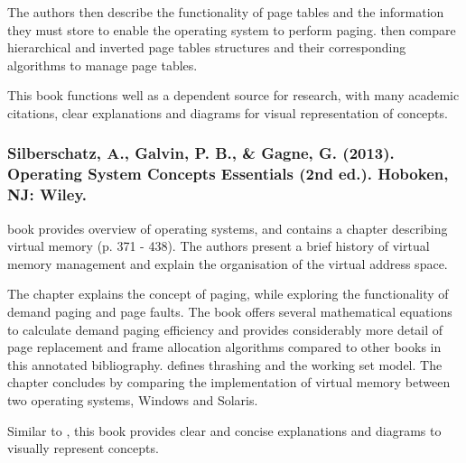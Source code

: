 The authors then describe the functionality of page tables and the information they must store to enable the operating system to perform paging. \citet{Jacob2008} then compare hierarchical and inverted page tables structures and their corresponding algorithms to manage page tables.

This book functions well as a dependent source for research, with many academic citations, clear explanations and diagrams for visual representation of concepts.

\subsubsection*{Silberschatz, A., Galvin, P. B., \& Gagne, G. (2013). Operating System Concepts Essentials (2nd ed.). Hoboken, NJ: Wiley.}

 book provides overview of operating systems, and contains a chapter describing virtual memory (p. 371 - 438). The authors present a brief history of virtual memory management and explain the organisation of the virtual address space.

The chapter explains the concept of paging, while exploring the functionality of demand paging and page faults. The book offers several mathematical equations to calculate demand paging efficiency and provides considerably more detail of page replacement and frame allocation algorithms compared to other books in this annotated bibliography. \citet{Silberschatz2013} defines thrashing and the working set model. The chapter concludes by comparing the implementation of virtual memory between two operating systems, Windows and Solaris.

Similar to \citet{Jacob2008}, this book provides clear and concise explanations and diagrams to visually represent concepts. 

